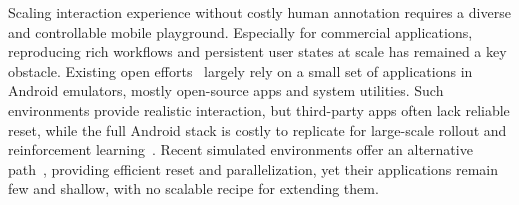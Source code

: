 Scaling interaction experience without costly human annotation requires a diverse and controllable mobile playground. 
Especially for commercial applications, reproducing rich workflows and persistent user states at scale has remained a key obstacle.
Existing open efforts~\citep{sun2025genesis,cheng2026openmobile} largely rely on a small set of applications in Android emulators, mostly open-source apps and system utilities. Such environments provide realistic interaction, but third-party apps often lack reliable reset, while the full Android stack is costly to replicate for large-scale rollout and reinforcement learning~\citep{rawles2025androidworld}. Recent simulated environments offer an alternative path~\citep{wu2026mobilegym, liu2026phoneworld}, providing efficient reset and parallelization, yet their applications remain few and shallow, with no scalable recipe for extending them.


